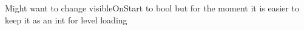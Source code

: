 
\begin{DoxyRefList}
\item[\label{bug__bug000001}%
\hypertarget{bug__bug000001}{}%
Member \hyperlink{class_finish_block_a98778169bc154ec4f534f67b2424ba95}{Finish\+Block\+:\+:Finish\+Block} (int x\+\_\+pos, int y\+\_\+pos, S\+D\+L\+\_\+\+Renderer $\ast$render, int visible\+On\+Start)]Might want to change visible\+On\+Start to bool but for the moment it is easier to keep it as an int for level loading 
\end{DoxyRefList}